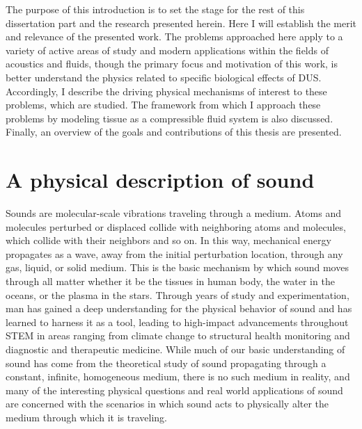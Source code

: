 The purpose of this introduction is to set the stage for the rest of
this dissertation part and the research presented herein. Here I will
establish the merit and relevance of the presented work. The problems
approached here apply to a variety of active areas of study and modern
applications within the fields of acoustics and fluids, though the
primary focus and motivation of this work, is better understand the
physics related to specific biological effects of
\ac{DUS}. Accordingly, I describe the driving physical mechanisms of
interest to these problems, which are studied. The framework from
which I approach these problems by modeling tissue as a compressible
fluid system is also discussed. Finally, an overview of the goals and
contributions of this thesis are presented.

\section{A physical description of sound}
Sounds are molecular-scale vibrations traveling through a
medium. Atoms and molecules perturbed or displaced collide with
neighboring atoms and molecules, which collide with their neighbors
and so on. In this way, mechanical energy propagates as a wave, away
from the initial perturbation location, through any gas, liquid, or
solid medium. This is the basic mechanism by which sound moves through
all matter whether it be the tissues in human body, the water in the
oceans, or the plasma in the stars. Through years of study and
experimentation, man has gained a deep understanding for the physical
behavior of sound and has learned to harness it as a tool, leading to
high-impact advancements throughout \ac{STEM} in areas ranging from
climate change to structural health monitoring and diagnostic and
therapeutic medicine. While much of our basic understanding of sound
has come from the theoretical study of sound propagating through a
constant, infinite, homogeneous medium, there is no such medium in
reality, and many of the interesting physical questions and real
world applications of sound are concerned with the scenarios in which
sound acts to physically alter the medium through which it is
traveling.

